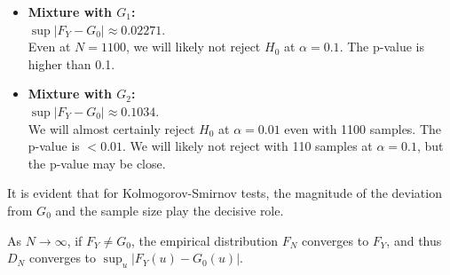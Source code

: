 \documentclass{article}
\begin{document}
\begin{itemize}
    \item \textbf{Mixture with \(G_1\):}\\
    \(\sup|F_Y-G_0|\approx 0.02271\).\\  
    Even at \(N=1100\), we will likely not reject \(H_0\) at \(\alpha=0.1\). The p-value is higher than 0.1.
    \item \textbf{Mixture with \(G_2\):}\\
    \(\sup|F_Y-G_0|\approx 0.1034\).\\
    We will almost certainly reject \(H_0\) at \(\alpha=0.01\) even with 1100 samples. The p-value is \(<0.01\). We will likely not reject with 110 samples at \(\alpha=0.1\), but the p-value may be close.
\end{itemize}

It is evident that for Kolmogorov-Smirnov tests, the magnitude of the deviation from \(G_0\) and the sample size play the decisive role.

As \(N \to \infty\), if \(F_Y \neq G_0\), the empirical distribution \(F_N\) converges to \(F_Y\), and thus \(D_N\) converges to \(\sup_u |F_Y(u)-G_0(u)|\).
\end{document}
